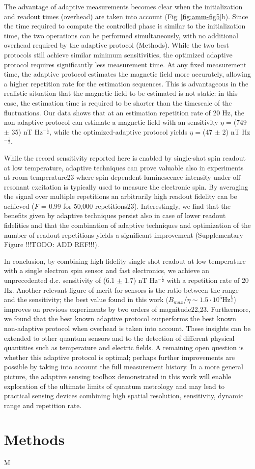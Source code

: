 The advantage of adaptive measurements becomes clear when the initialization and readout times (overhead) are taken into account (Fig \,\ref{fig:amm-fig5}b). Since the time required to compute the controlled phase is similar to the initialization time, the two operations can be performed simultaneously, with no additional overhead required by the adaptive protocol (Methods). While the two best protocols still achieve similar minimum sensitivities, the optimized adaptive protocol requires significantly less measurement time. At any fixed measurement time, the adaptive protocol estimates the magnetic field more accurately, allowing a higher repetition rate for the estimation sequences. This is advantageous in the realistic situation that the magnetic field to be estimated is not static: in this case, the estimation time is required to be shorter than the timescale of the fluctuations. Our data shows that at an estimation repetition rate of 20 Hz, the non-adaptive protocol can estimate a magnetic field with an sensitivity $\eta$ = (749 $\pm$ 35) nT Hz$^{-\frac{1}{2}}$, while the optimized-adaptive protocol yields $\eta$ = (47 $\pm$ 2) nT Hz$^{-\frac{1}{2}}$.

While the record sensitivity reported here is enabled by single-shot spin readout at low temperature, adaptive techniques can prove valuable also in experiments at room temperature23 where spin-dependent luminescence intensity under off-resonant excitation is typically used to measure the electronic spin. By averaging the signal over multiple repetitions an arbitrarily high readout fidelity can be achieved (\textit{F} = 0.99 for 50,000 repetitions23). Interestingly, we find that the benefits given by adaptive techniques persist also in case of lower readout fidelities and that the combination of adaptive techniques and optimization of the number of readout repetitions yields a significant improvement (Supplementary Figure !!!TODO: ADD REF!!!).

In conclusion, by combining high-fidelity single-shot readout at low temperature with a single electron spin sensor and fast electronics, we achieve an unprecedented d.c. sensitivity of (6.1 $\pm$ 1.7) nT Hz$^{-\frac{1}{2}}$ with a repetition rate of 20 Hz. Another relevant figure of merit for sensors is the ratio between the range and the sensitivity; the best value found in this work ($B_{max}$/$\eta \sim 1.5 \cdot 10^5 $Hz$^{\frac{1}{2}}$) improves on previous experiments by two orders of magnitude22,23. Furthermore, we found that the best known adaptive protocol outperforms the best known non-adaptive protocol when overhead is taken into account. These insights can be extended to other quantum sensors and to the detection of different physical quantities such as temperature and electric fields. A remaining open question is whether this adaptive protocol is optimal; perhaps further improvements are possible by taking into account the full measurement history. In a more general picture, the adaptive sensing toolbox demonstrated in this work will enable exploration of the ultimate limits of quantum metrology and may lead to practical sensing devices combining high spatial resolution, sensitivity, dynamic range and repetition rate.



\section{Methods}
M


%
